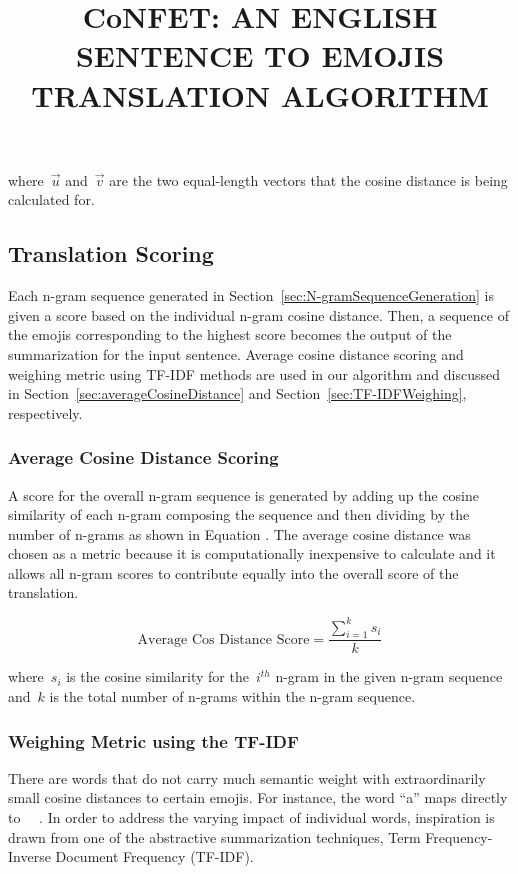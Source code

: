 \documentclass{article}[10]
\newcommand*{\img}[1]{%
  \raisebox{-.3\baselineskip}{%
    \texttt{[image: \#1]}%
  }%
} \title{{CoNFET:} AN ENGLISH SENTENCE TO EMOJIS TRANSLATION ALGORITHM}
\begin{document}
where~\(\vec{u}\) and~\(\vec{v}\) are the two equal-length vectors that the
cosine distance is being calculated for.

\subsection{Translation Scoring\label{sec:translationScoring}}

Each n-gram sequence generated in Section~\ref{sec:N-gramSequenceGeneration} is
given a score based on the individual n-gram cosine distance. Then, a sequence
of the emojis corresponding to the highest score becomes the output of the
summarization for the input sentence. Average cosine distance scoring and
weighing metric using TF-IDF methods are used in our algorithm and discussed in
Section~\ref{sec:averageCosineDistance} and Section~\ref{sec:TF-IDFWeighing},
respectively.

\subsubsection{Average Cosine Distance Scoring\label{sec:averageCosineDistance}}

A score for the overall n-gram sequence is generated by adding up the cosine
similarity of each n-gram composing the sequence and then dividing by the number
of n-grams as shown in Equation . The average
cosine distance was chosen as a metric because it is computationally inexpensive
to calculate and it allows all n-gram scores to contribute equally into the
overall score of the translation.

\begin{equation}
  \textrm{Average Cos Distance Score} = \frac{\sum_{i=1}^{k}s_{i}}{k} \label{eq:averageCosineDistance}
\end{equation}

where~\(s_{i}\) is the cosine similarity for the~\(i^{th}\) n-gram in the given
n-gram sequence and~\(k\) is the total number of n-grams within the n-gram
sequence.

\subsubsection{Weighing Metric using the TF-IDF\label{sec:TF-IDFWeighing}}

There are words that do not carry much semantic weight with extraordinarily
small cosine distances to certain emojis. For instance, the word ``a'' maps
directly to~~\img{emojis/1f4af.png}. In order to address the varying impact of
individual words, inspiration is drawn from one of the abstractive summarization
techniques, Term Frequency-Inverse Document Frequency (TF-IDF).
\end{document}
